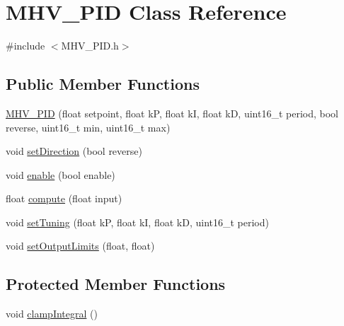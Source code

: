 \hypertarget{class_m_h_v___p_i_d}{
\section{\-M\-H\-V\-\_\-\-P\-I\-D \-Class \-Reference}
\label{class_m_h_v___p_i_d}
}


{\ttfamily \#include $<$\-M\-H\-V\-\_\-\-P\-I\-D.\-h$>$}

\subsection*{\-Public \-Member \-Functions}
\begin{DoxyCompactItemize}
\item 
\hyperlink{class_m_h_v___p_i_d_a0923aad1d58009d5724e68fc4ca1b3a8}{\-M\-H\-V\-\_\-\-P\-I\-D} (float setpoint, float k\-P, float k\-I, float k\-D, uint16\-\_\-t period, bool reverse, uint16\-\_\-t min, uint16\-\_\-t max)
\item 
void \hyperlink{class_m_h_v___p_i_d_a95369e1c3664baf5cf909225a93c6428}{set\-Direction} (bool reverse)
\item 
void \hyperlink{class_m_h_v___p_i_d_a2887eab7746720d7cd105ca4dfbb753c}{enable} (bool enable)
\item 
float \hyperlink{class_m_h_v___p_i_d_abda9f16bcf4154a86814e069bf1f74b3}{compute} (float input)
\item 
void \hyperlink{class_m_h_v___p_i_d_a1232a57f9e484887c9df927affacc534}{set\-Tuning} (float k\-P, float k\-I, float k\-D, uint16\-\_\-t period)
\item 
void \hyperlink{class_m_h_v___p_i_d_a697f31eedba0445d6e69df90c86ae9e9}{set\-Output\-Limits} (float, float)
\end{DoxyCompactItemize}
\subsection*{\-Protected \-Member \-Functions}
\begin{DoxyCompactItemize}
\item 
void \hyperlink{class_m_h_v___p_i_d_ae07f66a0dbc8a14844d157e97654ecd8}{clamp\-Integral} ()
\end{DoxyCompactItemize}
